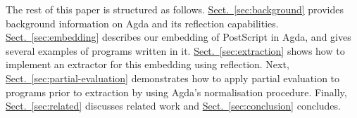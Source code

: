 \documentclass[sigplan,anonymous,review]{acmart}
\newcommand{\myref}[2]{\hyperref[#2]{#1~\ref*{#2}}}
\newcommand{\secref}[1]{\myref{Sect.}{sec:#1}}
\begin{document}
The rest of this paper is structured as follows. \secref{background}
provides background information on Agda and its reflection
capabilities. \secref{embedding} describes our embedding of PostScript
in Agda, and gives several examples of programs written in
it. \secref{extraction} shows how to implement an extractor for this
embedding using reflection. Next, \secref{partial-evaluation}
demonstrates how to apply partial evaluation to programs prior to
extraction by using Agda's normalisation procedure. Finally,
\secref{related} discusses related work and \secref{conclusion}
concludes.

\begin{comment}
\todo[inline]{Move it somewhere}
This picture has been generated by the code that was extracted from our
Agda embedding.

\begin{center}
\epsfbox[0 0 64 64]{sierp.ps}
\end{center}
\end{comment}

%
\end{document}
